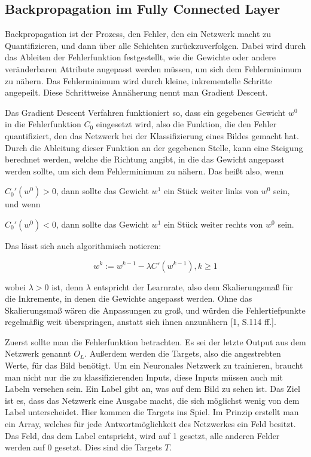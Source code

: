 \documentclass[12pt]{article}
\begin{document}
\subsection{Backpropagation im Fully Connected Layer}
Backpropagation ist der Prozess, den Fehler, den ein Netzwerk macht zu Quantifizieren, und dann über alle Schichten zurückzuverfolgen. Dabei wird durch das Ableiten der Fehlerfunktion festgestellt, wie die Gewichte oder andere veränderbaren Attribute angepasst werden müssen, um sich dem Fehlerminimum zu nähern. Das Fehlerminimum wird durch kleine, inkrementelle Schritte angepeilt. Diese Schrittweise Annäherung nennt man Gradient Descent. 

Das Gradient Descent Verfahren funktioniert so, dass ein gegebenes Gewicht $w^0$ in die Fehlerfunktion $C_0$ eingesetzt wird, also die Funktion, die den Fehler quantifiziert, den das Netzwerk bei der Klassifizierung eines Bildes gemacht hat. Durch die Ableitung dieser Funktion an der gegebenen Stelle, kann eine Steigung berechnet werden, welche die Richtung angibt, in die das Gewicht angepasst werden sollte, um sich dem Fehlerminimum zu nähern. 
Das heißt also, wenn 

$C_0'(w^0)>0$, dann sollte das Gewicht $w^1$ ein Stück weiter links von $w^0$ sein, und wenn

$C_0'(w^0)<0$, dann sollte das Gewicht $w^1$ ein Stück weiter rechts von $w^0$ sein.

Das lässt sich auch algorithmisch notieren:

$$w^k:=w^{k-1}-\lambda C'(w^{k-1}), k \geq 1$$

wobei $\lambda > 0$ ist, denn $\lambda$ entspricht der Learnrate, also dem Skalierungsmaß für die Inkremente, in denen die Gewichte angepasst werden. Ohne das Skalierungsmaß wären die Anpassungen zu groß, und würden die Fehlertiefpunkte regelmäßig weit überspringen, anstatt sich ihnen anzunähern [1, S.114 ff.]. 

Zuerst sollte man die Fehlerfunktion betrachten. 
Es sei der letzte Output aus dem Netzwerk genannt $O_L$. Außerdem werden die Targets, also die angestrebten Werte, für das Bild benötigt. Um ein Neuronales Netzwerk zu trainieren, braucht man nicht nur die zu klassifizierenden Inputs, diese Inputs müssen auch mit Labeln versehen sein. Ein Label gibt an, was auf dem Bild zu sehen ist. Das Ziel ist es, dass das Netzwerk eine Ausgabe macht, die sich möglichst wenig von dem Label unterscheidet. Hier kommen die Targets ins Spiel. Im Prinzip erstellt man ein Array, welches für jede Antwortmöglichkeit des Netzwerkes ein Feld besitzt. Das Feld, das dem Label entspricht, wird auf 1 gesetzt, alle anderen Felder werden auf 0 gesetzt. Dies sind die Targets $T$.
\end{document}
